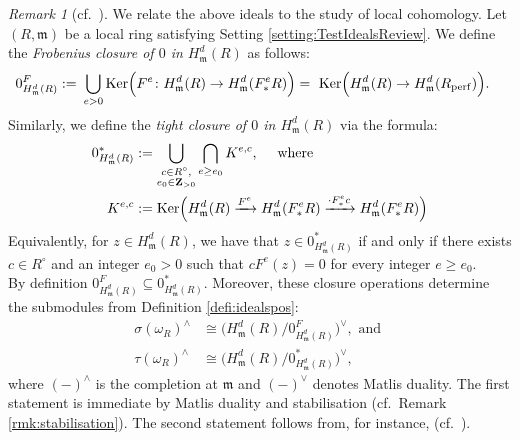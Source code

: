 \documentclass[letterpaper,11pt]{amsart}
\theoremstyle{plain}
\theoremstyle{definition}
\theoremstyle{remark}
\newtheorem{rmk}[thm]{Remark}
\def\Z{{\mathbf Z}}
\def\frm{\mathfrak{m}}
\def\m{\mathfrak{m}} %
\begin{document}
\begin{rmk}[{cf.\ \cite[Definition 1.3]{Srinivas-Takagi}}]
We relate the above ideals to the study of local cohomology. Let $(R,\m)$ be a local ring satisfying
Setting \ref{setting:TestIdealsReview}. We define the \emph{Frobenius closure of $0$ in $H^d_\frm(R)$} as follows:
\begin{align*}
0^F_{H^d_\m(R)} :=&\ \bigcup_{e>0} {\rm Ker}\Big(F^e \colon H^d_{\m}(R) \to H^d_{\m}(F^e_*R)\Big) 
=\  {\rm Ker}\Big(H^d_{\m}(R) \to H^d_{\m}(R_{\rm perf})\Big).
\end{align*}
Similarly, we define the \emph{tight closure of $0$ in $H^d_\frm(R)$} via the formula:
\begin{align*}
0^*_{H^d_\m(R)} &:= \bigcup_{\substack{c \in R^{\circ},\\ e_0 \in \Z_{>0}}} \bigcap_{e \geq e_0} K^{e,c}, \quad \text{ where }\\
K^{e,c} &:= {\rm Ker}\Big(H^d_{\m}(R) \xrightarrow{F^e} H^d_{\m}(F^e_*R) \xrightarrow{\cdot F^e_*c} H^d_{\m}(F^e_*R) \Big) 
\end{align*}
Equivalently, for $z \in H^d_\m(R)$, 
    we have that $z \in 0^*_{H^d_\m(R)}$ if and only if 
    there exists $c \in R^{\circ}$ and an integer $e_0>0$ such that 
    $cF^e(z)=0$ for every integer $e \geq e_0$.\\

By definition $0^F_{H^d_\m(R)} \subseteq 0^*_{H^d_\m(R)}$.  Moreover, these closure operations determine the submodules from Definition \ref{defi:idealspos}:
\begin{align} \label{eq:tauMD}
\sigma(\omega_R)^{\wedge} &\cong \Big(H^d_\m(R)/0^F_{H^d_\m(R)} \Big)^\vee, \text{ and } \\
\tau(\omega_R)^{\wedge} &\cong \Big(H^d_\m(R)/0^*_{H^d_\m(R)} \Big)^\vee, \nonumber
\end{align}
where $(-)^{\wedge}$ is the completion at $\m$ and  $(-)^{\vee}$ denotes Matlis duality. The first statement is immediate by Matlis duality and stabilisation (cf.\ Remark \ref{rmk:stabilisation}). The second statement follows from, for instance,  \cite[Lemma 7.6]{epstein2026closureoperationsinducedresolutions} (cf.\ \cite[Definition 2.3(3) and Definition 2.9(3)]{KTTWYY3}).
\end{rmk} 
\end{document}
